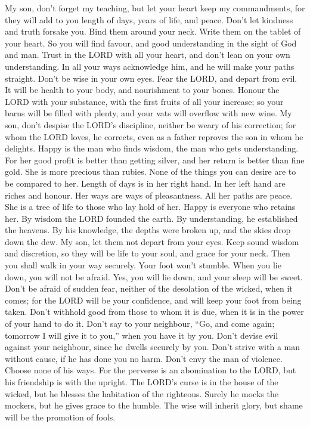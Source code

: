  My son, don't forget my teaching, but let your heart keep
my commandments,  for they will add to you length of days,
years of life, and peace.  Don't let kindness and truth
forsake you. Bind them around your neck. Write them on the tablet of
your heart.  So you will find favour, and good
understanding in the sight of God and man.  Trust in the
LORD with all your heart, and don't lean on your own understanding.
 In all your ways acknowledge him, and he will make your
paths straight.  Don't be wise in your own eyes. Fear the
LORD, and depart from evil.  It will be health to your
body, and nourishment to your bones.  Honour the LORD with
your substance, with the first fruits of all your increase;
 so your barns will be filled with plenty, and your vats
will overflow with new wine.  My son, don't despise the
LORD's discipline, neither be weary of his correction; 
for whom the LORD loves, he corrects, even as a father reproves the son
in whom he delights.  Happy is the man who finds wisdom,
the man who gets understanding.  For her good profit is
better than getting silver, and her return is better than fine gold.
 She is more precious than rubies. None of the things you
can desire are to be compared to her.  Length of days is
in her right hand. In her left hand are riches and honour.
 Her ways are ways of pleasantness. All her paths are
peace.  She is a tree of life to those who lay hold of
her. Happy is everyone who retains her.  By wisdom the
LORD founded the earth. By understanding, he established the heavens.
 By his knowledge, the depths were broken up, and the
skies drop down the dew.  My son, let them not depart
from your eyes. Keep sound wisdom and discretion,  so
they will be life to your soul, and grace for your neck. 
Then you shall walk in your way securely. Your foot won't stumble.
 When you lie down, you will not be afraid. Yes, you will
lie down, and your sleep will be sweet.  Don't be afraid
of sudden fear, neither of the desolation of the wicked, when it comes;
 for the LORD will be your confidence, and will keep your
foot from being taken.  Don't withhold good from those to
whom it is due, when it is in the power of your hand to do it.
 Don't say to your neighbour, ``Go, and come again;
tomorrow I will give it to you,'' when you have it by you.
 Don't devise evil against your neighbour, since he
dwells securely by you.  Don't strive with a man without
cause, if he has done you no harm.  Don't envy the man of
violence. Choose none of his ways.  For the perverse is
an abomination to the LORD, but his friendship is with the upright.
 The LORD's curse is in the house of the wicked, but he
blesses the habitation of the righteous.  Surely he mocks
the mockers, but he gives grace to the humble.  The wise
will inherit glory, but shame will be the promotion of fools.

